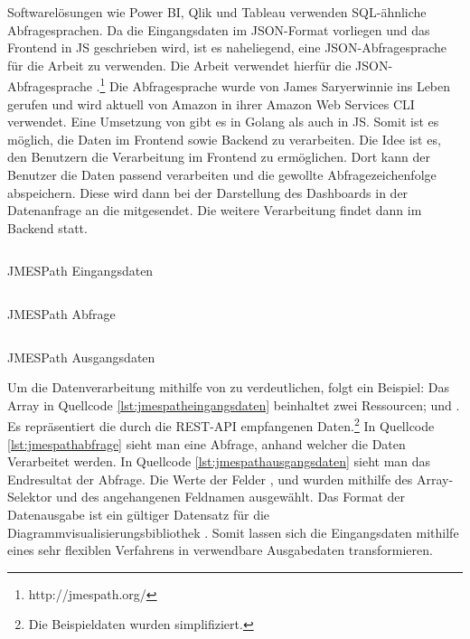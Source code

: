 Softwarelösungen wie Power BI, Qlik und Tableau verwenden SQL-ähnliche Abfragesprachen.
Da die Eingangsdaten im JSON-Format vorliegen und das Frontend in JS geschrieben wird,
ist es naheliegend, eine JSON-Abfragesprache für die Arbeit zu verwenden. Die Arbeit
verwendet hierfür die JSON-Abfragesprache .\footnote{http://jmespath.org/}
Die Abfragesprache wurde von James Saryerwinnie ins Leben gerufen und wird aktuell von
Amazon in ihrer Amazon Web Services CLI verwendet.\cite{AWSJMESPath} Eine Umsetzung von
 gibt es in Golang als auch in JS. Somit ist es möglich, die Daten im
Frontend sowie Backend zu verarbeiten. Die Idee ist es, den Benutzern die Verarbeitung
im Frontend zu ermöglichen. Dort kann der Benutzer die Daten passend verarbeiten und die
gewollte Abfragezeichenfolge abspeichern. Diese wird dann bei der Darstellung des 
Dashboards in der Datenanfrage an die  mitgesendet.
Die weitere Verarbeitung findet dann im Backend statt.

\begin{listing}[]
    \inputminted{jsx}{snippets/json/jmespath-example/jmespathinput.json}
    \caption{JMESPath Eingangsdaten}
    \label{lst:jmespatheingangsdaten}
\end{listing}

\begin{listing}[]
    \inputminted{jsx}{snippets/json/jmespath-example/jmespathquery.txt}
    \caption{JMESPath Abfrage}
    \label{lst:jmespathabfrage}
\end{listing}

\begin{listing}[]
    \inputminted{jsx}{snippets/json/jmespath-example/jmespathoutput.json}
    \caption{JMESPath Ausgangsdaten}
    \label{lst:jmespathausgangsdaten}
\end{listing}

Um die Datenverarbeitung mithilfe von  zu verdeutlichen, folgt ein
Beispiel: Das Array in Quellcode \ref{lst:jmespatheingangsdaten} beinhaltet zwei Ressourcen;
 und . Es repräsentiert die durch die REST-API empfangenen
Daten.\footnote{Die Beispieldaten wurden simplifiziert.} In Quellcode \ref{lst:jmespathabfrage}
sieht man eine Abfrage, anhand welcher die Daten Verarbeitet werden. In Quellcode \ref{lst:jmespathausgangsdaten}
sieht man das Endresultat der Abfrage. Die Werte der Felder ,  und 
wurden mithilfe des Array-Selektor \code{[]} und des angehangenen Feldnamen ausgewählt.
Das Format der Datenausgabe ist ein gültiger Datensatz für die Diagrammvisualisierungsbibliothek
. Somit lassen sich die Eingangsdaten mithilfe eines sehr flexiblen Verfahrens
in verwendbare Ausgabedaten transformieren.

